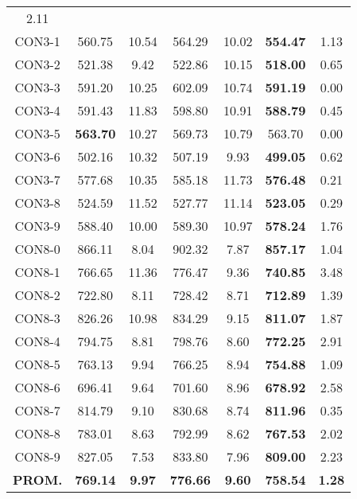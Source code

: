 \begin{table}[ht]
\begin{tabular}{c c c c c c c}
2.11\\CON3-1 & 560.75 & 10.54 & 
564.29 & 10.02 & \bf{554.47} & 
1.13\\CON3-2 & 521.38 & 9.42 & 
522.86 & 10.15 & \bf{518.00} & 
0.65\\CON3-3 & 591.20 & 10.25 & 
602.09 & 10.74 & \bf{591.19} & 
0.00\\CON3-4 & 591.43 & 11.83 & 
598.80 & 10.91 & \bf{588.79} & 
0.45\\CON3-5 & \bf{563.70} & 10.27 & 
569.73 & 10.79 & 563.70 & 0.00\\
CON3-6 & 502.16 & 10.32 & 
507.19 & 9.93 & \bf{499.05} & 
0.62\\CON3-7 & 577.68 & 10.35 & 
585.18 & 11.73 & \bf{576.48} & 
0.21\\CON3-8 & 524.59 & 11.52 & 
527.77 & 11.14 & \bf{523.05} & 
0.29\\CON3-9 & 588.40 & 10.00 & 
589.30 & 10.97 & \bf{578.24} & 
1.76\\CON8-0 & 866.11 & 8.04 & 
902.32 & 7.87 & \bf{857.17} & 
1.04\\CON8-1 & 766.65 & 11.36 & 
776.47 & 9.36 & \bf{740.85} & 
3.48\\CON8-2 & 722.80 & 8.11 & 
728.42 & 8.71 & \bf{712.89} & 
1.39\\CON8-3 & 826.26 & 10.98 & 
834.29 & 9.15 & \bf{811.07} & 
1.87\\CON8-4 & 794.75 & 8.81 & 
798.76 & 8.60 & \bf{772.25} & 
2.91\\CON8-5 & 763.13 & 9.94 & 
766.25 & 8.94 & \bf{754.88} & 
1.09\\CON8-6 & 696.41 & 9.64 & 
701.60 & 8.96 & \bf{678.92} & 
2.58\\CON8-7 & 814.79 & 9.10 & 
830.68 & 8.74 & \bf{811.96} & 
0.35\\CON8-8 & 783.01 & 8.63 & 
792.99 & 8.62 & \bf{767.53} & 
2.02\\CON8-9 & 827.05 & 7.53 & 
833.80 & 7.96 & \bf{809.00} & 
2.23\\\bf{PROM.} & 
\bf{769.14} & \bf{9.97} & \bf{776.66} & \bf{9.60} & \bf{758.54} & \bf{1.28}\\[1ex]\hline
\end{tabular}
\label{table:nonlin}
\end{table} \clearpage
